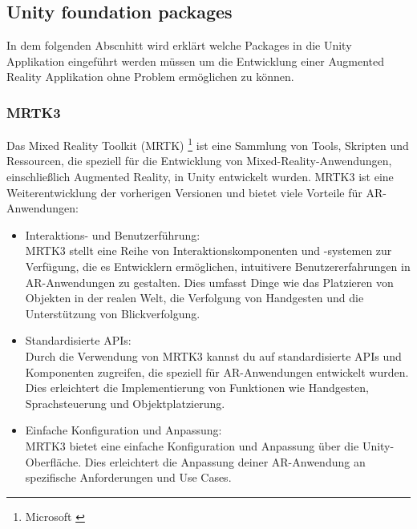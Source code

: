 \subsection{Unity foundation packages}
In dem folgenden Abscnhitt wird erklärt welche Packages in die Unity Applikation
eingeführt werden müssen um die Entwicklung einer Augmented Reality Applikation ohne Problem
ermöglichen zu können.

\subsubsection{MRTK3}
Das Mixed Reality Toolkit (MRTK) \footnote{Microsoft \cite{MRTK3}} ist eine Sammlung von Tools,
Skripten und Ressourcen, die speziell für die Entwicklung von Mixed-Reality-Anwendungen, einschließlich Augmented
Reality, in Unity entwickelt wurden. MRTK3 ist eine Weiterentwicklung der vorherigen Versionen und bietet viele
Vorteile für AR-Anwendungen:
\begin{itemize}
    \item Interaktions- und Benutzerführung: \\
    MRTK3 stellt eine Reihe von Interaktionskomponenten und -systemen zur
    Verfügung, die es Entwicklern ermöglichen, intuitivere Benutzererfahrungen in AR-Anwendungen zu gestalten.
    Dies umfasst Dinge wie das Platzieren von Objekten in der realen Welt, die Verfolgung von Handgesten und die
    Unterstützung von Blickverfolgung.
    \item Standardisierte APIs: \\
    Durch die Verwendung von MRTK3 kannst du auf standardisierte APIs und Komponenten
    zugreifen, die speziell für AR-Anwendungen entwickelt wurden. Dies erleichtert die Implementierung von Funktionen
    wie Handgesten, Sprachsteuerung und Objektplatzierung.
    \item Einfache Konfiguration und Anpassung: \\
    MRTK3 bietet eine einfache Konfiguration und Anpassung über die
    Unity-Oberfläche. Dies erleichtert die Anpassung deiner AR-Anwendung an spezifische Anforderungen und Use Cases.
\end{itemize}

